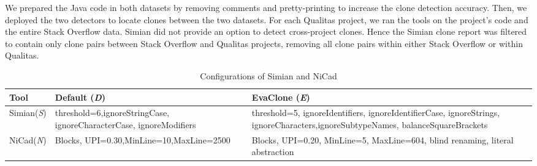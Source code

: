 \documentclass[sigconf,review, anonymous]{acmart}
\begin{document}
We prepared the Java code in both datasets by removing comments and
pretty-printing to increase the clone detection accuracy. Then, we
deployed the two detectors to locate clones between the two
datasets.  For each Qualitas project, we ran the tools on the
project's code and the entire Stack Overflow data.
Simian did not provide an option to detect cross-project
clones. %
Hence the Simian clone report was filtered to contain only clone pairs
between Stack Overflow and Qualitas projects, removing all clone pairs
within either Stack Overflow or within Qualitas.

\begin{table}
  \centering
  \caption{Configurations of Simian and NiCad}
  \label{t:param_tuning}
  \small
  \begin{tabular}{p{0.7cm}|p{2.4cm}p{3.8cm}}
    \hline 
    Tool & Default (\textit{D}) & EvaClone (\textit{E}) \\
    \hline
    Simian\newline (\textit{S}) &  threshold=6,\newline ignoreStringCase, \newline ignoreCharacterCase, \newline ignoreModifiers & threshold=5, ignoreIdentifiers, \newline ignoreIdentifierCase, \newline ignoreStrings, ignoreCharacters,\newline ignoreSubtypeNames, \newline balanceSquareBrackets \\ 
    \hline 
    NiCad\newline (\textit{N}) & Blocks, UPI=0.30,\newline MinLine=10,\newline MaxLine=2500 & Blocks, UPI=0.20, \newline MinLine=5, MaxLine=604, \newline blind renaming, literal abstraction \\
    \hline
  \end{tabular} %
\end{table}
\end{document}
